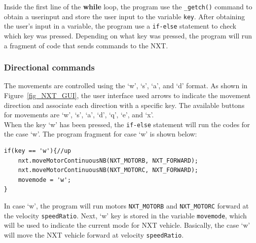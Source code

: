 \documentclass[11pt]{article}
\begin{document}
Inside the first line of the {\bf while} loop, the program use the {\tt \_getch()} 
command to obtain a userinput and store the user input to the variable {\tt key}. 
After obtaining the user's input in a variable, the program use a {\tt if-else} 
statement to check which key was pressed. Depending on what key was pressed, the 
program will run a fragment of code that sends commands to the NXT.

\subsubsection*{Directional commands}
The movements are controlled using the `w', `s', `a', and `d' format. As shown 
in Figure~\ref{fig_NXT_GUI}, the user interface used arrows to indicate the 
movement direction and associate each direction with a specific key. The 
available buttons for movements are `w', `s', `a', `d', `q', `e', and `x'.\\
When the key `w' has been pressed, the {\tt if-else} statement will run 
the codes for the case `w'. The program fragment for case `w' is shown below:
\begin{lstlisting}
if(key == 'w'){//up
    nxt.moveMotorContinuousNB(NXT_MOTORB, NXT_FORWARD);
    nxt.moveMotorContinuousNB(NXT_MOTORC, NXT_FORWARD);
    movemode = 'w';
}
\end{lstlisting}
In case `w', the program will run motors {\tt NXT\_MOTORB} and {\tt NXT\_MOTORC} 
forward at the velocity {\tt speedRatio}. Next, `w' key is stored in the variable 
{\tt movemode}, which will be used to indicate the current mode for NXT vehicle. 
Basically, the case `w' will move the NXT vehicle forward at velocity {\tt speedRatio}.\\
\end{document}
